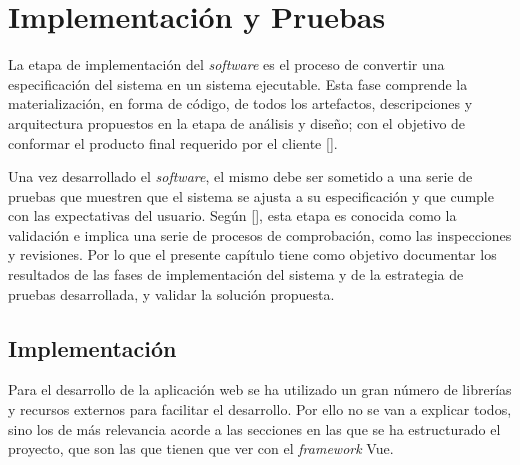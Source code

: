 \chapter{Implementación y Pruebas}\label{chapter:implementation}
La etapa de implementación del \textit{software} es el proceso de convertir una especificación del sistema en un sistema ejecutable. Esta fase comprende la materialización, en forma de código, de todos los artefactos, descripciones y arquitectura propuestos en la etapa de análisis y diseño; con el objetivo de conformar el producto final requerido por el cliente [\cite{91}].

Una vez desarrollado el \textit{software}, el mismo debe ser sometido a una serie de pruebas que muestren que el sistema se ajusta a su especificación y que cumple con las expectativas del usuario. Según [\cite{91}], esta etapa es conocida como la validación e implica una serie de procesos de comprobación, como las inspecciones y revisiones. Por lo que el presente capítulo tiene como objetivo documentar los resultados de las fases de implementación del sistema y de la estrategia de pruebas desarrollada, y validar la solución propuesta.


\section{Implementación}
Para el desarrollo de la aplicación web se ha utilizado un gran número de librerías y recursos externos para facilitar el desarrollo. Por ello no se van a explicar todos, sino los de más relevancia acorde a las secciones en las que se ha estructurado el proyecto, que son las que tienen que ver con el \textit{framework} Vue.


